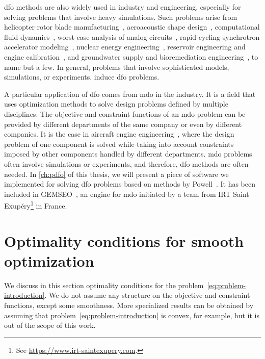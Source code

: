\Gls{dfo} methods are also widely used in industry and engineering, especially for solving problems that involve heavy simulations.
Such problems arise from helicopter rotor blade manufacturing~\cite{Booker_Etal_1998a,Booker_Etal_1998b,Serafini_1998}, aeroacoustic shape design~\cite{Marsden_2004,Marsden_Etal_2004}, computational fluid dynamics~\cite{Duvigneau_Visonneau_2004}, worst-case analysis of analog circuits~\cite{Latorre_Etal_2019}, rapid-cycling synchrotron accelerator modeling~\cite{Eldred_Etal_2021}, nuclear energy engineering~\cite{Kortelainen_Etal_2010,Kortelainen_Etal_2012,Kortelainen_Etal_2014}, reservoir engineering and engine calibration~\cite{Langouet_2011}, and groundwater supply and bioremediation engineering~\cite{Fowler_Etal_2008,Mugunthan_Shoemaker_Regis_2005,Yoon_Shoemaker_1999}, to name but a few.
In general, problems that involve sophisticated models, simulations, or experiments, induce \gls{dfo} problems.

A particular application of \gls{dfo} comes from \gls{mdo} in the industry.
It is a field that uses optimization methods to solve design problems defined by multiple disciplines.
The objective and constraint functions of an \gls{mdo} problem can be provided by different departments of the same company or even by different companies.
It is the case in aircraft engine engineering~\cite{Gazaix_Etal_2019}, where the design problem of one component is solved while taking into account constraints imposed by other components handled by different departments.
\Gls{mdo} problems often involve simulations or experiments, and therefore, \gls{dfo} methods are often needed.
In \cref{ch:pdfo} of this thesis, we will present a piece of software we implemented for solving \gls{dfo} problems based on methods by Powell~\cite{Powell_1994,Powell_2002,Powell_2006,Powell_2009,Powell_2015}.
It has been included in GEMSEO~\cite{Gallard_Etal_2018}, an engine for \gls{mdo} initiated by a team from IRT Saint Exup{\'{e}}ry\footnote{See \url{https://www.irt-saintexupery.com}.} in France.

\section{Optimality conditions for smooth optimization}
\label{sec:optimality-conditions}

We discuss in this section optimality conditions for the problem~\cref{eq:problem-introduction}.
We do not assume any structure on the objective and constraint functions, except some smoothness.
More specialized results can be obtained by assuming that problem~\cref{eq:problem-introduction} is convex, for example, but it is out of the scope of this work.

